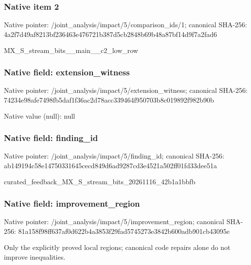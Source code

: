 \documentclass[10pt,a4paper]{article}
\begin{document}
\subsubsection{Native item 2}
Native pointer: /joint\_\allowbreak{}analysis/impact/5/comparison\_\allowbreak{}ids/1; canonical SHA-256: 4a2f7d49af8213bf236463e476721b387d5cb2848b69b48a87bf14d9f7a2fad6

\begingroup\raggedright\sloppy MX\_\allowbreak{}S\_\allowbreak{}stream\_\allowbreak{}bits\_\allowbreak{}\_\allowbreak{}main\_\allowbreak{}\_\allowbreak{}c2\_\allowbreak{}low\_\allowbreak{}row\par\endgroup

\subsubsection{Native field: extension\_\allowbreak{}witness}
Native pointer: /joint\_\allowbreak{}analysis/impact/5/extension\_\allowbreak{}witness; canonical SHA-256: 74234e98afe7498fb5daf1f36ac2d78acc339464f950703b8c019892f982b90b

Native value (null): null

\subsubsection{Native field: finding\_\allowbreak{}id}
Native pointer: /joint\_\allowbreak{}analysis/impact/5/finding\_\allowbreak{}id; canonical SHA-256: ab149194c58e14750331645cecd849d6ad9287cd3e4521a502ff01fd33dee51a

\begingroup\raggedright\sloppy curated\_\allowbreak{}feedback\_\allowbreak{}MX\_\allowbreak{}S\_\allowbreak{}stream\_\allowbreak{}bits\_\allowbreak{}20261116\_\allowbreak{}42b1a1bbfb\par\endgroup

\subsubsection{Native field: improvement\_\allowbreak{}region}
Native pointer: /joint\_\allowbreak{}analysis/impact/5/improvement\_\allowbreak{}region; canonical SHA-256: 81a158f98ff637af0d622b4a3853f29fad5745273e3842b600adb901cb43095e

\begingroup\raggedright\sloppy Only the explicitly proved local regions;\allowbreak{} canonical code repairs alone do not improve inequalities.\par\endgroup
\end{document}
